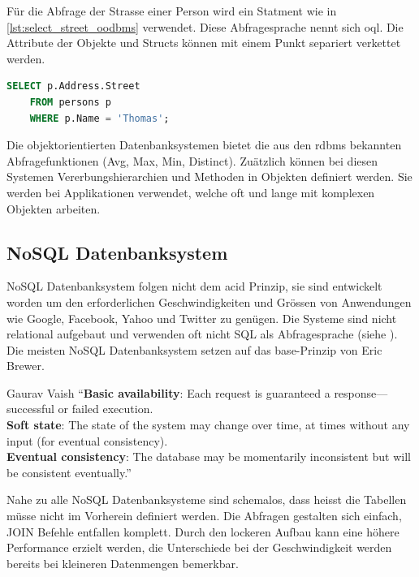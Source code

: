 Für die Abfrage der Strasse einer Person wird ein Statment wie in \autoref{lst:select_street_oodbms} verwendet. Diese Abfragesprache nennt
sich \gls{oql}. Die Attribute der Objekte und Structs können mit einem Punkt separiert verkettet werden.

\begin{lstlisting}[language=SQL, caption=Abfrage in objektorientierem Datenbanksystem, label=lst:select_street_oodbms]  
    SELECT p.Address.Street
    FROM persons p
    WHERE p.Name = 'Thomas';
\end{lstlisting}

Die objektorientierten Datenbanksystemen bietet die aus den \gls{rdbms} bekannten Abfragefunktionen (Avg, Max, Min, Distinct). 
Zuätzlich können bei diesen Systemen Vererbungshierarchien und Methoden in Objekten definiert werden. Sie werden bei Applikationen verwendet,
welche oft und lange mit komplexen Objekten arbeiten.

\subsection{NoSQL Datenbanksystem}\label{no_sql_db}
NoSQL Datenbanksystem folgen nicht dem \gls{acid} Prinzip, sie sind entwickelt worden um den erforderlichen Geschwindigkeiten und Grössen von Anwendungen wie Google, 
Facebook, Yahoo und Twitter zu genügen. Die Systeme sind nicht relational aufgebaut und verwenden oft nicht SQL als Abfragesprache (siehe \cite{vaish2013getting}). 
Die meisten NoSQL Datenbanksystem setzen auf das \gls{base}-Prinzip von Eric Brewer.

\begin{myQuote}{Gaurav Vaish \cite{vaish2013getting}}
"`\textbf{Basic availability}: Each request is guaranteed a response—successful or failed execution.\\
\textbf{Soft state}: The state of the system may change over time, at times without any input (for eventual consistency).\\
\textbf{Eventual consistency}: The database may be momentarily inconsistent but will be consistent eventually."'
\end{myQuote}

Nahe zu alle NoSQL Datenbanksysteme sind schemalos, dass heisst die Tabellen müsse nicht im Vorherein definiert werden. Die Abfragen gestalten sich einfach, JOIN Befehle entfallen 
komplett. Durch den lockeren Aufbau kann eine höhere Performance erzielt werden, die Unterschiede bei der Geschwindigkeit werden bereits bei kleineren Datenmengen bemerkbar.


